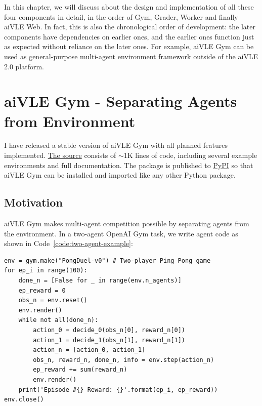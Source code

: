 In this chapter, we will discuss about the design and implementation of all these four components in detail, in the order of Gym, Grader, Worker and finally aiVLE Web. In fact, this is also the chronological order of development: the later components have dependencies on earlier ones, and the earlier ones function just as expected without reliance on the later ones. For example, aiVLE Gym can be used as general-purpose multi-agent environment framework outside of the aiVLE 2.0 platform.

\section{aiVLE Gym - Separating Agents from Environment}
\label{ch:aivle-gym}
I have released a stable version of aiVLE Gym with all planned features implemented. \href{https://github.com/edu-ai/aivle-gym}{The source} consists of $\sim$1K lines of code, including several example environments and full documentation. The package is published to \href{https://test.pypi.org/project/aivle-gym/}{PyPI} so that aiVLE Gym can be installed and imported like any other Python package.

\subsection{Motivation}
aiVLE Gym makes multi-agent competition possible by separating agents from the environment. In a two-agent OpenAI Gym task, we write agent code as shown in Code~\ref{code:two-agent-example}:

\begin{code}
\begin{verbatim}
env = gym.make("PongDuel-v0") # Two-player Ping Pong game
for ep_i in range(100):
    done_n = [False for _ in range(env.n_agents)]
    ep_reward = 0
    obs_n = env.reset()
    env.render()
    while not all(done_n):
        action_0 = decide_0(obs_n[0], reward_n[0])
        action_1 = decide_1(obs_n[1], reward_n[1])
        action_n = [action_0, action_1]
        obs_n, reward_n, done_n, info = env.step(action_n)
        ep_reward += sum(reward_n)
        env.render()
    print('Episode #{} Reward: {}'.format(ep_i, ep_reward))
env.close()
\end{verbatim}
\label{code:two-agent-example}
\end{code}

